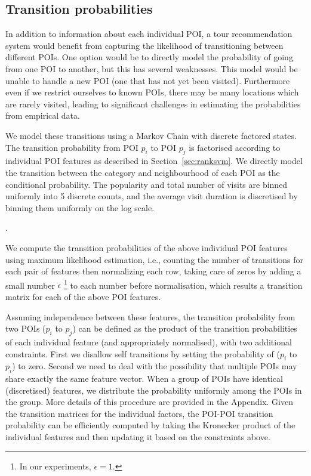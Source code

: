 \subsection{Transition probabilities}
\label{sec:transition}

In addition to information about each individual POI, a tour recommendation system would benefit
from capturing the likelihood of transitioning between different POIs. One option would be to
directly model the probability of going from one POI to another, but this has several weaknesses.
This model would be unable to handle a new POI (one that has not yet been visited).
Furthermore even if we restrict ourselves to known POIs, there may be many locations which
are rarely visited, leading to significant challenges in estimating the probabilities from
empirical data.

We model these transitions using a Markov Chain with discrete factored states.
The transition probability from POI $p_i$ to POI $p_j$ is factorised according to
individual POI features as described in Section~\ref{sec:ranksvm}. We directly model
the transition between the category and neighbourhood of each POI as the conditional probability.
The popularity and total number of visits are binned uniformly into 5 discrete counts,
and the average visit duration is discretised by binning them uniformly on the log scale.

.



We compute the transition probabilities of the above individual POI features
using maximum likelihood estimation,
i.e., counting the number of transitions for each pair of features then normalizing each row,
taking care of zeros by adding a small number $\epsilon$
\footnote{In our experiments, $\epsilon = 1$.}
to each number before normalisation,
which results a transition matrix for each of the above POI features.

Assuming independence between these features,
the transition probability from two POIs ($p_i$ to $p_j$) can be defined as the product
of the transition probabilities of each individual feature (and appropriately normalised),
with two additional constraints.
First we disallow self transitions by setting the probability of ($p_i$ to $p_i$) to zero.
Second we need to deal with the possibility that multiple POIs may share exactly the same
feature vector.
When a group of POIs have identical (discretised) features, we distribute the probability
uniformly among the POIs in the group. More details of this procedure are provided in the Appendix.
Given the transition matrices for the individual factors, the POI-POI transition probability
can be efficiently computed by taking the Kronecker product of the individual features
and then updating it based on the constraints above.

